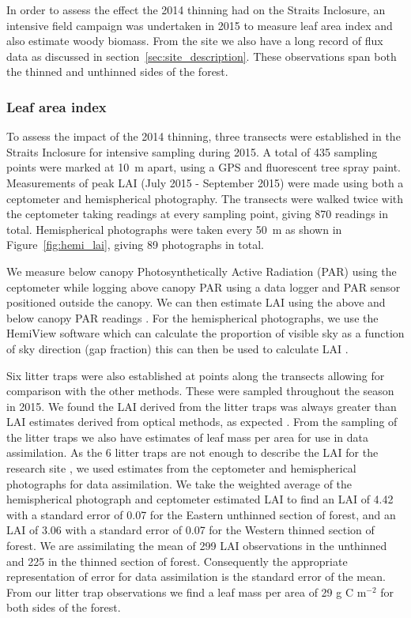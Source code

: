 \documentclass[draft,linenumbers]{agujournal}
\begin{document}
In order to assess the effect the 2014 thinning had on the Straits Inclosure, an intensive field campaign was undertaken in 2015 to measure leaf area index and also estimate woody biomass. From the site we also have a long record of flux data as discussed in section~\ref{sec:site_description}. These observations span both the thinned and unthinned sides of the forest.

\subsubsection{Leaf area index}

To assess the impact of the 2014 thinning, three transects were established in the Straits Inclosure for intensive sampling during 2015. A total of 435 sampling points were marked at 10~m apart, using a GPS and fluorescent tree spray paint. Measurements of peak LAI (July 2015 - September 2015) were made using both a ceptometer and hemispherical photography. The transects were walked twice with the ceptometer taking readings at every sampling point, giving 870 readings in total. Hemispherical photographs were taken every 50~m as shown in Figure~\ref{fig:hemi_lai}, giving 89 photographs in total. 

We measure below canopy Photosynthetically Active Radiation (PAR) using the ceptometer while logging above canopy PAR using a data logger and PAR sensor positioned outside the canopy. We can then estimate LAI using the above and below canopy PAR readings \citep{fassnacht1994comparison}. For the hemispherical photographs, we use the HemiView software \citep{rich1999hemiview} which can calculate the proportion of visible sky as a function of sky direction (gap fraction) this can then be used to calculate LAI \citep{Jonckheere2004}.

Six litter traps were also established at points along the transects allowing for comparison with the other methods. These were sampled throughout the season in 2015. We found the LAI derived from the litter traps was always greater than LAI estimates derived from optical methods, as expected \citep{breda2003ground}. From the sampling of the litter traps we also have estimates of leaf mass per area for use in data assimilation. As the 6 litter traps are not enough to describe the LAI for the research site \citep{kimmins1973some}, we used estimates from the ceptometer and hemispherical photographs for data assimilation. We take the weighted average of the hemispherical photograph and ceptometer estimated LAI to find an LAI of 4.42 with a standard error of 0.07 for the Eastern unthinned section of forest, and an LAI of 3.06 with a standard error of 0.07 for the Western thinned section of forest. We are assimilating the mean of 299 LAI observations in the unthinned and 225 in the thinned section of forest. Consequently the appropriate representation of error for data assimilation is the standard error of the mean. From our litter trap observations we find a leaf mass per area of 29 g C m\(^{-2}\) for both sides of the forest.
\end{document}

